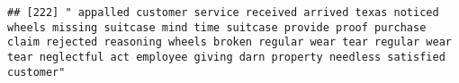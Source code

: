 \documentclass[
]{article}
\begin{document}
\begin{verbatim}
## [222] " appalled customer service received arrived texas noticed wheels missing suitcase mind time suitcase provide proof purchase claim rejected reasoning wheels broken regular wear tear regular wear tear neglectful act employee giving darn property needless satisfied customer"                                                                                                                                                                                                                                                                                                                                                                                                                                                                                                                                                                                                                                                                                                                                                                                                                                                                                                                                                                                                                                                                                                                                                                                                                                                                                                                                                                                                                                                                                                               

\end{verbatim}
\end{document}
